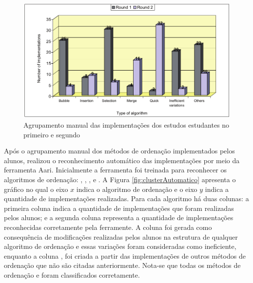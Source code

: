 	    \begin{figure}[h]
	        \centering
	        \includegraphics[scale=0.4]{imagem/clusterManual.png}
	        \captionsetup{justification=centering}
	        \caption{Agrupamento manual das implementações dos estudos estudantes no
	        	primeiro e segundo }
	        \label{fig:clusterManual}
	    \end{figure}
	    
	    Após o agrupamento manual dos métodos de ordenação implementados pelos alunos,
	     realizou o reconhecimento automático das
	    implementações por meio da ferramenta Aari. Inicialmente a ferramenta foi
	    treinada para reconhecer os algoritmos de ordenação: ,
	    , ,  e
	    . A Figura \ref{fig:clusterAutomatico} apresenta o gráfico
	    no qual o eixo $x$ indica o algoritmo de ordenação e o eixo $y$  indica a
	    quantidade de implementações realizadas. Para cada algoritmo há duas colunas:
	    a primeira coluna indica a quantidade de implementações que foram realizadas
	    pelos alunos; e a segunda coluna representa a quantidade de implementações
	    reconhecidas corretamente pela ferramente. A coluna 
	    foi gerada como consequência de modificações realizadas pelos alunos na
	    estrutura de qualquer algoritmo de ordenação e essas variações foram
	    consideradas como ineficiente, enquanto a coluna , foi
	    criada a partir das implementações de outros métodos de ordenação que
	    não são citadas anteriormente. Nota-se que todas os métodos de ordenação
	     e  foram classificados corretamente.
	    
